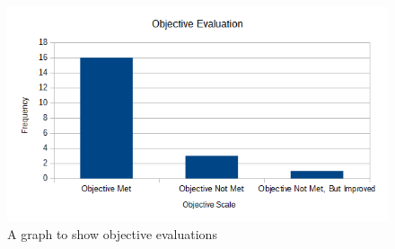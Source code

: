 \begin{figure}[H]
    \includegraphics[width=\textwidth]{./Evaluation/EvaluationQuestionnaire/graph2.png}
    \caption{A graph to show objective evaluations} \label{graph2}
\end{figure}

